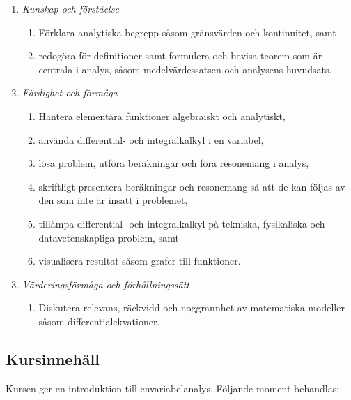 \begin{enumerate}
\def\labelenumi{\Alph{enumi}.}
\tightlist
\item
  \emph{Kunskap och förståelse}

  \begin{enumerate}
  \def\labelenumii{\Alph{enumi}.\arabic{enumii}.}
  \tightlist
  \item
    Förklara analytiska begrepp såsom gränsvärden och kontinuitet, samt
  \item
    redogöra för definitioner samt formulera och bevisa teorem som är
    centrala i analys, såsom medelvärdessatsen och analysens huvudsats.
  \end{enumerate}
\item
  \emph{Färdighet och förmåga}

  \begin{enumerate}
  \def\labelenumii{\Alph{enumi}.\arabic{enumii}.}
  \tightlist
  \item
    Hantera elementära funktioner algebraiskt och analytiskt,
  \item
    använda differential- och integralkalkyl i en variabel,
  \item
    lösa problem, utföra beräkningar och föra resonemang i analys,
  \item
    skriftligt presentera beräkningar och resonemang så att de kan
    följas av den som inte är insatt i problemet,
  \item
    tillämpa differential- och integralkalkyl på tekniska, fysikaliska
    och datavetenskapliga problem, samt
  \item
    visualisera resultat såsom grafer till funktioner.
  \end{enumerate}
\item
  \emph{Värderingsförmåga och förhållningssätt}

  \begin{enumerate}
  \def\labelenumii{\Alph{enumi}.\arabic{enumii}.}
  \tightlist
  \item
    Diskutera relevans, räckvidd och noggrannhet av matematiska modeller
    såsom differentialekvationer.
  \end{enumerate}
\end{enumerate}

\subsection*{Kursinnehåll}

Kursen ger en introduktion till envariabelanalys. Följande moment
behandlas:

